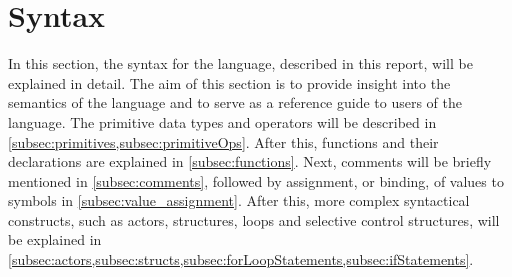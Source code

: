 \section{Syntax}
\label{sec:syntax}
In this section, the syntax for the language, described in this report, will be explained in detail. The aim of this section is to provide insight into the semantics of the language and to serve as a reference guide to users of the language. The primitive data types and operators will be described in \cref{subsec:primitives,subsec:primitiveOps}. After this, functions and their declarations are explained in \cref{subsec:functions}. Next, comments will be briefly mentioned in \cref{subsec:comments}, followed by assignment, or binding, of values to symbols in \cref{subsec:value_assignment}. After this, more complex syntactical constructs, such as actors, structures, loops and selective control structures, will be explained in \cref{subsec:actors,subsec:structs,subsec:forLoopStatements,subsec:ifStatements}. 









